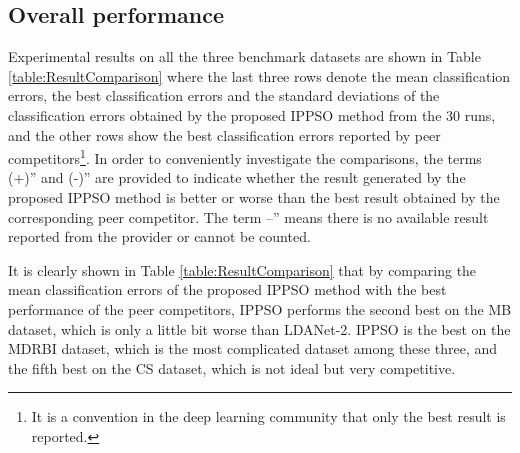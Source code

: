 \documentclass[conference]{IEEEtran}
\begin{document}
\subsection{Overall performance}\label{sec:Performance}

Experimental results on all the three benchmark datasets are shown in Table \ref{table:ResultComparison} where the last three rows denote the mean classification errors, the best classification errors and the standard deviations of the classification errors obtained by the proposed IPPSO method from the 30 runs, and the other rows show the best classification errors reported by peer competitors\footnote{It is a convention in the deep learning community that only the best result is reported.}. In order to conveniently investigate the comparisons, the terms (+)” and (-)” are provided to indicate whether the result generated by the proposed IPPSO method is better or worse than the best result obtained by the corresponding peer competitor. The term --” means there is no available result reported from the provider or cannot be counted.


It is clearly shown in Table \ref{table:ResultComparison} that by comparing the mean classification errors of the proposed IPPSO method with the best performance of the peer competitors, IPPSO performs the second best on the MB dataset, which is only a little bit worse than LDANet-2. IPPSO is the best on the MDRBI dataset, which is the most complicated dataset among these three, and the fifth best on the CS dataset, which is not ideal but very competitive.
\end{document}
